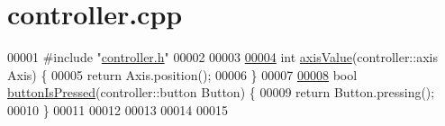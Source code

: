 \hypertarget{controller_8cpp_source}{}\section{controller.\+cpp}
\label{controller_8cpp_source}

\begin{DoxyCode}
00001 \textcolor{preprocessor}{#include "\mbox{\hyperlink{controller_8h}{controller.h}}"}
00002 
00003 
\mbox{\hyperlink{controller_8cpp_a73be3a8649e7d561a68cd816420efbd9_a73be3a8649e7d561a68cd816420efbd9}{00004}} \textcolor{keywordtype}{int} \mbox{\hyperlink{controller_8cpp_a73be3a8649e7d561a68cd816420efbd9_a73be3a8649e7d561a68cd816420efbd9}{axisValue}}(controller::axis Axis) \{
00005   \textcolor{keywordflow}{return} Axis.position();
00006 \}
00007 
\mbox{\hyperlink{controller_8cpp_aff3b02388de758f0fe6d98930ea57626_aff3b02388de758f0fe6d98930ea57626}{00008}} \textcolor{keywordtype}{bool} \mbox{\hyperlink{controller_8cpp_aff3b02388de758f0fe6d98930ea57626_aff3b02388de758f0fe6d98930ea57626}{buttonIsPressed}}(controller::button Button) \{
00009   \textcolor{keywordflow}{return} Button.pressing();
00010 \}
00011 
00012 
00013 
00014 
00015  
\end{DoxyCode}
